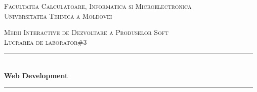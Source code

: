 \begin{center} %
	
	
	
	
	
	
	\textsc{\large Facultatea Calculatoare, Informatica si Microelectronica}\\[0.5cm]
	
	\textsc{\large Universitatea Tehnica a Moldovei}\\[1.2cm] %
	
	\vspace{25 mm}
	
	
	
	\textsc{\Large Medii Interactive de Dezvoltare a Produselor Soft}\\[0.5cm] %
	
	\textsc{\large Lucrarea de laborator\#3}\\[0.5cm] %
	
	
	
	
	\newcommand{\HRule}{\rule{\linewidth}{0.5mm}} %
	
	
	
	
	
	
	\vspace{10 mm}
	
	\HRule \\[0.4cm]
	
	{ \LARGE \bfseries Web Development  }\\[0.4cm] %
	
	\HRule \\[1.5cm]
	
	
	
	

\end{center}
